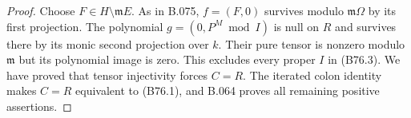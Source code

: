 \begin{proof}
Choose $F\in H\setminus\mathfrak mE$. As in B.075,
$f=(F,0)$ survives modulo $\mathfrak m\Omega$ by its first projection.
The polynomial $g=(0,P^M\bmod I)$ is null on $R$ and survives there
by its monic second projection over $k$.
Their pure tensor is nonzero modulo $\mathfrak m$ but its polynomial
image is zero. This excludes every proper $I$ in (B76.3).
We have proved that tensor injectivity forces $C=R$.
The iterated colon identity makes $C=R$ equivalent to (B76.1), and
B.064 proves all remaining positive assertions.
\end{proof}
